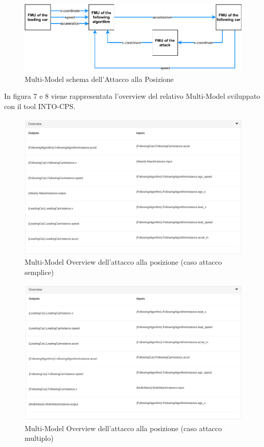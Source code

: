 \begin{figure}[H]
	\centering
	\includegraphics{img/XAttackSchema.pdf}
	\caption{Multi-Model schema dell'Attacco alla Posizione}
\end{figure}

In figura 7 e 8 viene rappresentata l'overview del relativo Multi-Model sviluppato con il tool INTO-CPS. 


\begin{figure}[H]
	\centering
	\includegraphics[width=\textwidth]{img/OverviewXSingle.png}
	\caption{Multi-Model Overview dell'attacco alla posizione (caso attacco semplice)}
\end{figure}
\begin{figure}[H]
	\centering
	\includegraphics[width=\textwidth]{img/OverviewXMulti.png}
	\caption{Multi-Model Overview dell'attacco alla posizione (caso attacco multiplo)}
\end{figure}

